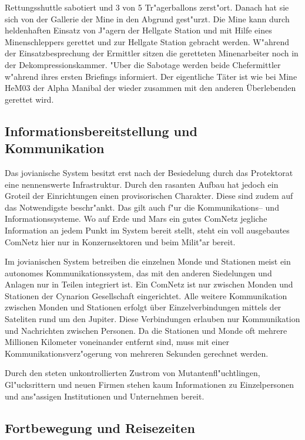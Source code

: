 \begin{description}
      Rettungsshuttle sabotiert und 3 von 5 Tr"agerballons zerst"ort. Danach hat sie sich von der Gallerie der Mine in den Abgrund gest"urzt. Die Mine kann durch heldenhaften Einsatz von J"agern der Hellgate Station und mit Hilfe eines Minenschleppers gerettet und zur Hellgate Station gebracht werden. W"ahrend der Einsatzbesprechung der Ermittler sitzen die geretteten Minenarbeiter noch in der Dekompressionskammer. "Uber die Sabotage werden beide Chefermittler w"ahrend ihres ersten Briefings informiert. Der eigentliche
      Täter ist wie bei Mine HeM03 der Alpha Manibal der wieder zusammen mit den anderen Überlebenden gerettet wird.
\end{description}

\subsection{Informationsbereitstellung und Kommunikation}

Das jovianische System besitzt erst nach der Besiedelung durch das Protektorat eine nennenswerte Infrastruktur. Durch den rasanten Aufbau hat jedoch ein Gro\3teil der Einrichtungen einen provisorischen Charakter. Diese sind zudem auf das Notwendigste beschr"ankt. Das gilt auch f"ur die Kommunikations-- und Informationssysteme. Wo auf Erde und Mars ein gutes ComNetz jegliche Information an jedem Punkt im System bereit stellt, steht ein voll ausgebautes ComNetz hier nur in Konzernsektoren und beim Milit"ar bereit.

Im jovianischen System  betreiben die einzelnen Monde und Stationen meist ein autonomes Kommunikationssystem, das mit den anderen Siedelungen und Anlagen nur in Teilen integriert ist. Ein ComNetz ist nur zwischen Monden und Stationen der Cynarion Gesellschaft eingerichtet. Alle weitere Kommunikation zwischen Monden und Stationen erfolgt über Einzelverbindungen mittels der Sateliten rund um den Jupiter. Diese Verbindungen erlauben nur Kommunikation und Nachrichten zwischen Personen. Da die Stationen und Monde oft mehrere Millionen Kilometer voneinander entfernt sind, muss mit einer Kommunikationsverz"ogerung von mehreren Sekunden gerechnet werden.

Durch den steten unkontrollierten Zustrom von Mutantenfl"uchtlingen, Gl"ucksrittern und neuen Firmen stehen kaum Informationen zu Einzelpersonen und ans"assigen Institutionen und Unternehmen bereit.

\subsection{Fortbewegung und Reisezeiten}

